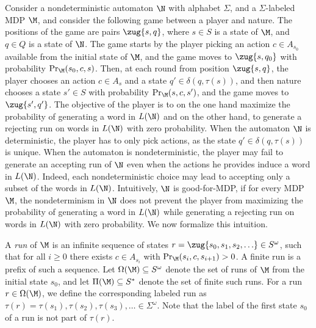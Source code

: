 \documentclass{lmcs}
\begin{document}
Consider a nondeterministic automaton $\N$ with alphabet $\Sigma$, and a $\Sigma$-labeled MDP $\M$, and consider the following game between a player and nature. The positions of the game are pairs $\zug{s,q}$, where $s\in S$ is a state of $\M$, and $q\in Q$ is a state of $\N$. The game starts by the player picking an action $c\in A_{s_0}$ available from the initial state of $\M$, and the game moves to $\zug{s,q_0}$ with probability $\Pr_\M(s_0,c,s)$. Then, at each round from position $\zug{s,q}$, the player chooses an action $c\in A_s$ and a state $q'\in \delta(q,\tau(s))$, and then nature chooses a state $s'\in S$ with probability $\Pr_\M(s,c,s')$, and the game moves to $\zug{s',q'}$. 
The objective of the player is to on the one hand maximize the probability of generating a word in $L(\N)$ and on the other hand, to generate a rejecting run on words in $L(\N)$ with zero probability.
When the automaton $\N$ is deterministic, the player has to only pick actions, as the state $q'\in \delta(q,\tau(s))$ is unique. When the automaton is nondeterministic, the player may fail to generate an accepting run of $\N$ even when the actions he provides induce a word in $L(\N)$. Indeed, each nondeterministic choice may lead to accepting only a subset of the words in $L(\N)$. 
Intuitively, $\N$ is good-for-MDP, if for every MDP $\M$, the nondeterminism in $\N$ does not prevent the player from maximizing the probability of generating a word in $L(\N)$ while generating a rejecting run on words in $L(\N)$ with zero probability. We now formalize this intuition.

A {\em run\/} of $\M$ is an infinite sequence of states $r=\zug{s_0,s_1,s_2,\ldots}\in S^\omega$, such that for all $i\geq 0$ there exists $c\in A_{s_i}$ with $\Pr_\M(s_i,c,s_{i+1}) > 0$. A finite run is a prefix of such a sequence. Let $\Omega(\M)\subseteq S^\omega$ denote the set of runs of $\M$ from the initial state $s_0$, and let $\Pi(\M)\subseteq S^*$ denote the set of finite such runs. 
For a run $r\in \Omega(\M)$, we define the corresponding labeled run as $\tau(r) = \tau(s_1),\tau(s_2),\tau(s_3),\ldots\in \Sigma^\omega$. Note that the label of the first state $s_0$ of a run is not part of $\tau(r)$. 
\end{document}
